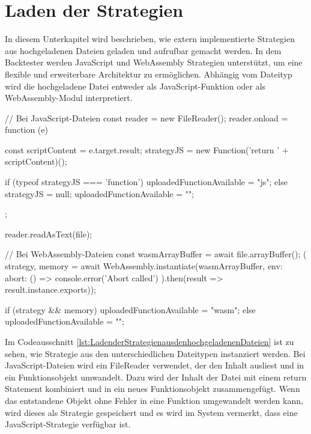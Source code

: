 \section{Laden der Strategien}
\label{sec:LadenderStrategien}

In diesem Unterkapitel wird beschrieben, wie extern implementierte Strategien aus hochgeladenen Dateien geladen und aufrufbar gemacht werden.
In dem Backtester werden JavaScript und WebAssembly Strategien unterstützt, um eine flexible und erweiterbare Architektur zu ermöglichen.
Abhängig vom Dateityp wird die hochgeladene Datei entweder als JavaScript-Funktion oder als WebAssembly-Modul interpretiert.

\begin{JsCode}[caption={Laden der Strategien aus den hochgeladenen Dateien}, label={lst:LadenderStrategienausdenhochgeladenenDateien}]
    // Bei JavaScript-Dateien
    const reader = new FileReader();
    reader.onload = function (e) {
        const scriptContent = e.target.result;
        strategyJS = new Function('return ' + scriptContent)();

        if (typeof strategyJS === 'function') {
            uploadedFunctionAvailable = "js";
        } else {
            strategyJS = null;
            uploadedFunctionAvailable = "";
        }
    };

    reader.readAsText(file);

    // Bei WebAssembly-Dateien
    const wasmArrayBuffer = await file.arrayBuffer();
    ({ strategy, memory } = await WebAssembly.instantiate(wasmArrayBuffer, {
        env: {
            abort: () => console.error('Abort called')
        }
    }).then(result => result.instance.exports));

    if (strategy && memory) {
        uploadedFunctionAvailable = "wasm";
    } else {
        uploadedFunctionAvailable = "";
    }
\end{JsCode}

Im Codeausschnitt \ref{lst:LadenderStrategienausdenhochgeladenenDateien} ist zu sehen, wie Strategie aus den unterschiedlichen Dateitypen instanziert werden.
Bei JavaScript-Dateien wird ein FileReader verwendet, der den Inhalt ausliest und in ein Funktionsobjekt umwandelt.
Dazu wird der Inhalt der Datei mit einem return Statement kombiniert und in ein neues Funktionsobjekt zusammengefügt.
Wenn das entstandene Objekt ohne Fehler in eine Funktion umgewandelt werden kann, wird dieses als Strategie gespeichert und es wird im System vermerkt, dass eine JavaScript-Strategie verfügbar ist.

